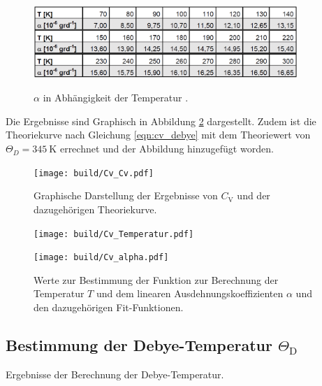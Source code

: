 \begin{figure}[!h]
	\centering
	\caption[]{$\alpha$ in Abhängigkeit der Temperatur \cite{V47}.}
	\includegraphics[width = 10cm]{img/alpha.png}	
	\label{Alpha}
\end{figure}

Die Ergebnisse sind Graphisch in Abbildung \ref{Cv_gra} dargestellt.
Zudem ist die Theoriekurve nach Gleichung \eqref{eqn:cv_debye} mit dem Theoriewert von $\Theta_D = \SI{345}{\kelvin}$ \cite{kupfer3} errechnet und der Abbildung hinzugefügt worden.

\begin{figure}
	\centering
	\texttt{[image: build/Cv\_Cv.pdf]}
	\caption[]{Graphische Darstellung der Ergebnisse von $C_\mathrm{V}$ und der dazugehörigen Theoriekurve.}
	\label{Cv_gra}
\end{figure}

\begin{figure}
	\begin{minipage}{8cm}
		\texttt{[image: build/Cv\_Temperatur.pdf]}
	\end{minipage}
	\hfill
	\begin{minipage}{8cm}
		\texttt{[image: build/Cv\_alpha.pdf]}
	\end{minipage}
	\caption[]{Werte zur Bestimmung der Funktion zur Berechnung der Temperatur $T$ und dem linearen Ausdehnungskoeffizienten $\alpha$ und den dazugehörigen Fit-Funktionen.}
\end{figure}

\subsection{Bestimmung der Debye-Temperatur $\Theta_\mathrm{D}$} %
\label{sub:bestimmung_der_debye_temperatur_theta_mathrm}

\begin{table}[!h]
	\centering
	\caption[]{Ergebnisse der Berechnung der Debye-Temperatur.}
	
	\label{Theta_Debye}
\end{table}

